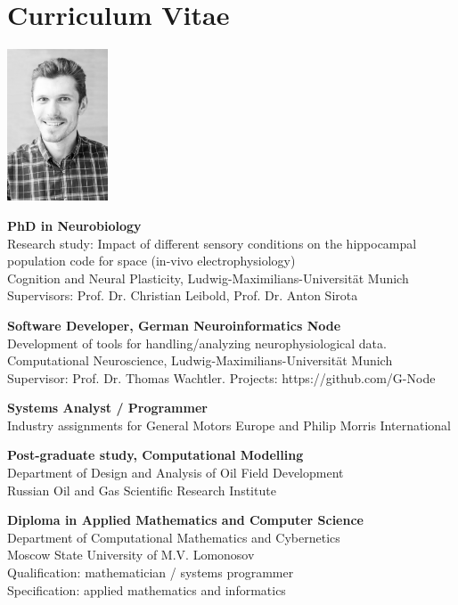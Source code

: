 \chapter{Curriculum Vitae}

\includegraphics[width=30mm]{assets/me.jpg}

\textbf{PhD in Neurobiology}\\
Research study: Impact of different sensory conditions on the hippocampal population code for space (in-vivo electrophysiology)\\
Cognition and Neural Plasticity, Ludwig-Maximilians-Universität Munich\\
Supervisors: Prof. Dr. Christian Leibold, Prof. Dr. Anton Sirota

\textbf{Software Developer, German Neuroinformatics Node}\\
Development of tools for handling/analyzing neurophysiological data.\\
Computational Neuroscience, Ludwig-Maximilians-Universität Munich\\
Supervisor: Prof. Dr. Thomas Wachtler. Projects: https://github.com/G-Node

\textbf{Systems Analyst / Programmer}\\
Industry assignments for General Motors Europe and Philip Morris International

\textbf{Post-graduate study, Computational Modelling}\\
Department of Design and Analysis of Oil Field Development\\
Russian Oil and Gas Scientific Research Institute

\textbf{Diploma in Applied Mathematics and Computer Science}\\
Department of Computational Mathematics and Cybernetics\\
Moscow State University of M.V. Lomonosov\\
Qualification: mathematician / systems programmer\\
Specification: applied mathematics and informatics



